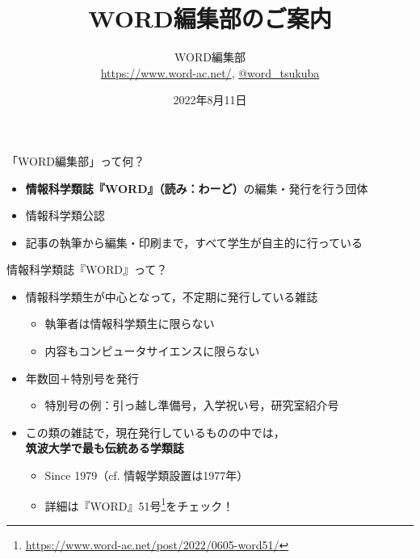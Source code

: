 \documentclass[platex]{beamer}
\title{\textbf{WORD編集部のご案内}}
\author{WORD編集部\\\url{https://www.word-ac.net/}, \href{https://twitter.com/word\_tsukuba}{@word\_tsukuba}}
\date{2022年8月11日}   %
\begin{document}
\maketitle
\begin{frame}[plain]{「WORD編集部」って何？}
\begin{itemize}
 \item \alert{\textbf{情報科学類誌『WORD』（読み：わーど）}}の編集・発行を行う団体
 \item 情報科学類公認
 \item 記事の執筆から編集・印刷まで，すべて学生が自主的に行っている
\end{itemize}
\end{frame}
\begin{frame}[plain]{情報科学類誌『WORD』って？}
 \begin{itemize}
  \item 情報科学類生が中心となって，不定期に発行している雑誌
  \begin{itemize}
   \item 執筆者は情報科学類生に限らない
   \item 内容もコンピュータサイエンスに限らない
  \end{itemize}
  \item 年数回＋特別号を発行
  \begin{itemize}
   \item 特別号の例：引っ越し準備号，入学祝い号，研究室紹介号
  \end{itemize}
  \item \alert{この類の雑誌で，現在発行しているものの中では，\\\textbf{筑波大学で最も伝統ある学類誌}}
  \begin{itemize}
   \item Since 1979（cf. 情報学類設置は1977年）
   \item 詳細は『WORD』51号\footnote{\url{https://www.word-ac.net/post/2022/0605-word51/}}をチェック！
  \end{itemize}
 \end{itemize}
\end{frame}
\end{document}

